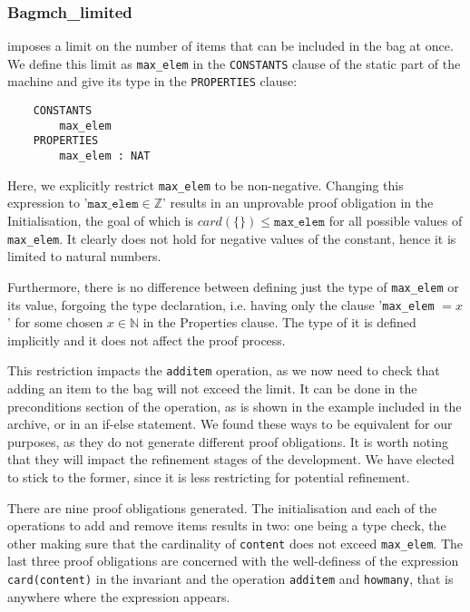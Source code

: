 \documentclass[11pt,journal]{IEEEtran}
\begin{document}
	
	\subsubsection{Bagmch\_limited} imposes a limit on the number of items that can be included in the bag at once. We define this limit as \texttt{max\_elem} in the \texttt{CONSTANTS} clause of the static part of the machine and give its type in the \texttt{PROPERTIES} clause:
	
	\begin{lstlisting}
	CONSTANTS
		max_elem
	PROPERTIES
		max_elem : NAT
	\end{lstlisting}
	
	Here, we explicitly restrict \texttt{max\_elem} to be non-negative. Changing this expression to '$\texttt{max\_elem} \in \mathbb{Z}$' results in an unprovable proof obligation in the Initialisation, the goal of which is $card(\{\}) \leq \texttt{max\_elem}$ for all possible values of \texttt{max\_elem}. It clearly does not hold for negative values of the constant, hence it is limited to natural numbers.
	
	Furthermore, there is no difference between defining just the type of \texttt{max\_elem} or its value, forgoing the type declaration, i.e. having only the clause '\texttt{max\_elem} $= x$' for some chosen $x \in \mathbb{N}$ in the Properties clause. The type of it is defined implicitly and it does not affect the proof process.

	This restriction impacts the \texttt{additem} operation, as we now need to check that adding an item to the bag will not exceed the limit. It can be done in the preconditions section of the operation, as is shown in the example included in the archive, or in an if-else statement. We found these ways to be equivalent for our purposes, as they do not generate different proof obligations. It is worth noting that they will impact the refinement stages of the development. We have elected to stick to the former, since it is less restricting for potential refinement.
	
	There are nine proof obligations generated. The initialisation and each of the operations to add and remove items results in two: one being a type check, the other making sure that the cardinality of \texttt{content} does not exceed \texttt{max\_elem}. The last three proof obligations are concerned with the well-definess of the expression \texttt{card(content)} in the invariant and the operation \texttt{additem} and \texttt{howmany}, that is anywhere where the expression appears.
	
\end{document}
